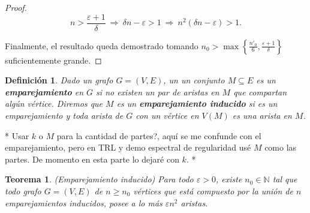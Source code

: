 \documentclass{article}[14pts]
\newcommand{\fs}[1]{{\color{blue}* #1 *}}
\newtheorem{teorema}{Teorema}
\newtheorem{definicion}{Definición}
\let\varepsilon=\varepsilon
\begin{document}
\begin{proof}
    \begin{equation*}
        n > \frac{\varepsilon + 1}{\delta} \ \Rightarrow\  \delta n - \varepsilon > 1 \ \Rightarrow\  n^{2}(\delta n - \varepsilon) > 1.
    \end{equation*}\medskip

    Finalmente, el resultado queda demostrado tomando $n_0 > \max\left\lbrace \frac{n'_0}{6}, \frac{\varepsilon + 1}{\delta}\right\rbrace$ suficientemente grande.
\end{proof}\medskip

\begin{definicion}
    Dado un grafo $G = (V,E)$, un un conjunto $M\subseteq E$ es un \textbf{emparejamiento} en $G$ si no existen un par de aristas en $M$ que compartan algún vértice. %
    Diremos que $M$ es un \textbf{emparejamiento inducido} si es un emparejamiento y toda arista de $G$ con un vértice en $V(M)$ es una arista en $M$.
\end{definicion}

\fs{Usar $k$ o $M$ para la cantidad de partes?, aquí se me confunde con el emparejamiento, pero en TRL y demo espectral de regularidad usé $M$ como las partes. De momento en esta parte lo dejaré con $k$.}

\begin{teorema}  \label{Teo_emp_ind} (Emparejamiento inducido)
    Para todo $\varepsilon > 0$, existe $n_0\in \mathbb{N}$ tal que todo grafo $G = (V,E)$ de $n\geq n_0$ vértices que está compuesto por la unión de $n$ emparejamientos inducidos, posee a lo más $\varepsilon n^{2}$ aristas.
\end{teorema}
\end{document}
